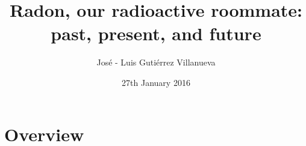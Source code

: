 \documentclass[xcolor=svgnames]{beamer}
\title
  [Seminar NUI - Jan 2016\hspace{2em}]
  {Radon, our radioactive roommate: past, present,  and future}
\author
  [Jos\'e Luis Guti\'errez Villanueva]
  {Jos\'e - Luis Guti\'errez Villanueva}
\date
  {27th January 2016}
\institute
  {LaRUC,  University of Cantabria (Spain)}
\newcommand{\1}{\'{\i}}
\begin{document}
\maketitle

%
%

\section*{Overview}
\begin{frame}{}
\tableofcontents[hideallsubsections]
\end{frame}












%
%



%
%
\end{document}
